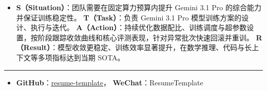 \documentclass{resume}
\begin{document}
\begin{itemize}
    \item \textbf{S（Situation）}：团队需要在固定算力预算内提升 Gemini 3.1 Pro 的综合能力并保证训练稳定性。 \textbf{T（Task）}：负责 Gemini 3.1 Pro 模型训练方案的设计、执行与迭代。 \textbf{A（Action）}：持续优化数据配比、训练调度与超参数设置，按阶段跟踪收敛曲线和核心评测表现，针对异常批次快速回滚并重训。 \textbf{R（Result）}：模型收敛更稳定、训练效率显著提升，在数学推理、代码与长上下文等多项指标达到当期 SOTA。
\end{itemize}

\hrule
\begin{itemize}[itemindent=-0.50cm]
  \item[] \textbf{GitHub}：\href{https://github.com/resume-template}{\underline{resume-template}}，
          \textbf{WeChat}：ResumeTemplate
\end{itemize}
\end{document}
